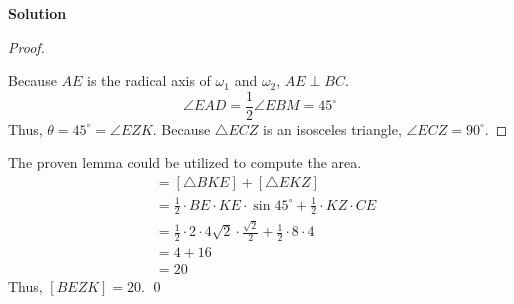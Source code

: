 \documentclass{article}
\theoremstyle{remark}
\newenvironment{solution}{\begin{trivlist}\item[]{\bf Solution}}
    {\qed \end{trivlist}}
\begin{document}
\begin{solution}
\begin{proof}
\begin{center}
\end{center}
Because $AE$ is the radical axis of $\omega_1$ and
$\omega_2$, $AE \perp BC$.
\[
\angle{EAD} = \frac{1}{2} \angle{EBM} = 45^\circ
\]
Thus, $\theta = 45^\circ = \angle{EZK}$. Because
$\triangle{ECZ}$ is an isosceles triangle,
$\angle{ECZ} = 90^\circ$.
\end{proof}

The proven lemma could be utilized to compute the area.
\begin{align*}
    [BEZK]
    &= [\triangle{BKE}] + [\triangle{EKZ}] \\
    &= \frac{1}{2} \cdot BE \cdot KE \cdot \sin{45^\circ}
        + \frac{1}{2} \cdot KZ \cdot CE \\
    &= \frac{1}{2} \cdot 2 \cdot 4\sqrt{2} \cdot
        \frac{\sqrt{2}}{2} + \frac{1}{2} \cdot 8 \cdot 4 \\
    &= 4 + 16 \\
    &= 20
\end{align*}
Thus, $[BEZK] = 20$.
\end{solution}
\end{document}
